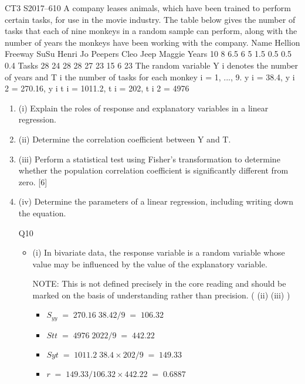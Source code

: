 \documentclass[a4paper,12pt]{article}
\begin{document}
CT3 S2017–610
A company leases animals, which have been trained to perform certain tasks, for
use in the movie industry. The table below gives the number of tasks that each of
nine monkeys in a random sample can perform, along with the number of years the
monkeys have been working with the company.
Name Hellion Freeway SuSu Henri Jo Peepers Cleo Jeep Maggie
Years 10 8 6.5 6 5 1.5 0.5 0.5 0.4
Tasks 28 24 28 28 27 23 15 6 23
The random variable Y i denotes the number of years and T i the number of tasks for
each monkey i = 1, ..., 9.
\sum y i = 38.4, \sum y i 2 = 270.16, \sum y i t i = 1011.2, \sum t i = 202, \sum t i 2 = 4976
\begin{enumerate}
\item (i)
Explain the roles of response and explanatory variables in a linear regression.
\item 
(ii) Determine the correlation coefficient between Y and T.
\item (iii) Perform a statistical test using Fisher’s transformation to determine whether
the population correlation coefficient is significantly different from zero. [6]

\item (iv) Determine the parameters of a linear regression, including writing down the
equation.


Q10

\begin{itemize}
\item (i)
In bivariate data, the response variable is a random variable whose value may
be influenced by the value of the explanatory variable.

NOTE: This is not defined precisely in the core reading and should be marked
on the basis of understanding rather than precision.
(
(ii)
(iii)
)

\begin{itemize}
\item $ { \displaystyle S_{yy} \;=\; 270.16  38.4 2 / 9 \;=\; 106.32 }$
\item $ { \displaystyle S tt \;=\; 4976  202 2 / 9 \;=\; 442.22 }$
\item $ { \displaystyle S yt \;=\; 1011.2  38.4 \times 202 / 9 \;=\; 149.33 }$
\item $ { \displaystyle r \;=\; 149.33 / 106.32 \times 442.22 \;=\; 0.6887 }$
\end{itemize}


\end{itemize}
\end{enumerate}
\end{document}
